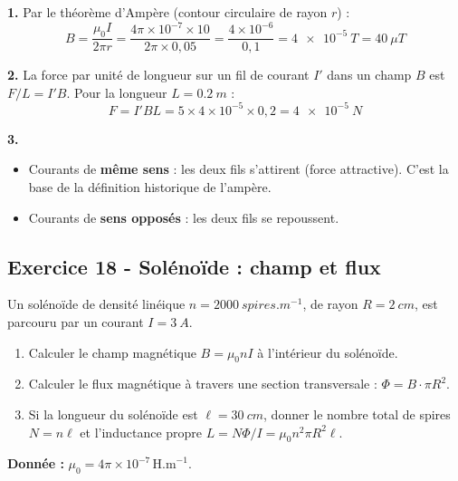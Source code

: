 \documentclass[12pt,a4paper]{article}
\begin{document}
\begin{boitecorrige}
\textbf{1.} Par le théorème d'Ampère (contour circulaire de rayon $r$) :
\[
B = \frac{\mu_0 I}{2\pi r} = \frac{4\pi\times10^{-7}\times10}{2\pi\times0{,}05} = \frac{4\times10^{-6}}{0{,}1} = \qty{4e-5}{T} = \qty{40}{\mu T}
\]

\textbf{2.} La force par unité de longueur sur un fil de courant $I'$ dans un champ $B$ est $F/L = I'B$. Pour la longueur $L = \qty{0.2}{m}$ :
\[
F = I' B L = 5\times4\times10^{-5}\times0{,}2 = \qty{4e-5}{N}
\]

\textbf{3.}
\begin{itemize}
  \item Courants de \textbf{même sens} : les deux fils s'attirent (force attractive). C'est la base de la définition historique de l'ampère.
  \item Courants de \textbf{sens opposés} : les deux fils se repoussent.
\end{itemize}
\end{boitecorrige}

\subsection*{Exercice 18 - Solénoïde : champ et flux \niveau{\facile}}

\begin{boiteexercice}
Un solénoïde de densité linéique $n = \qty{2000}{spires.m^{-1}}$, de rayon $R = \qty{2}{cm}$, est parcouru par un courant $I = \qty{3}{A}$.
\begin{enumerate}
  \item Calculer le champ magnétique $B = \mu_0 n I$ à l'intérieur du solénoïde.
  \item Calculer le flux magnétique à travers une section transversale : $\Phi = B\cdot\pi R^2$.
  \item Si la longueur du solénoïde est $\ell = \qty{30}{cm}$, donner le nombre total de spires $N = n\ell$ et l'inductance propre $L = N\Phi/I = \mu_0 n^2 \pi R^2 \ell$.
\end{enumerate}
\textbf{Donnée :} $\mu_0 = 4\pi\times10^{-7}\,\text{H.m}^{-1}$.
\end{boiteexercice}
\end{document}
